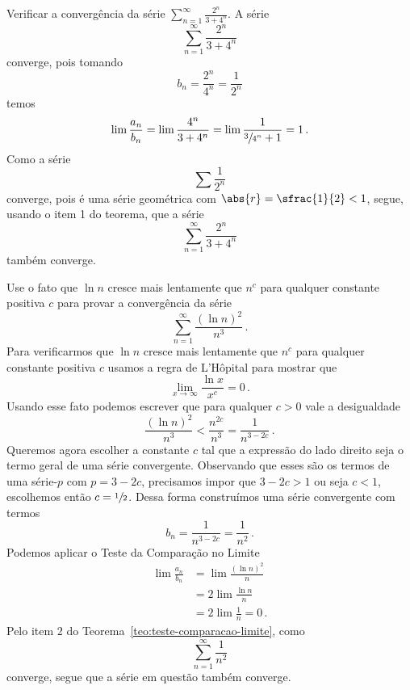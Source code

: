 \begin{example}
  Verificar a convergência da série
  \(
    \sum_{n=1}^\infty \frac{2^n}{3+4^n}
  \).
  \solution
  A série
  \[
    \sum_{n=1}^\infty \frac{2^n}{3+4^n}
  \]
  converge, pois tomando
  \[
    b_n=\frac{2^n}{4^n}=\frac{1}{2^n}
  \]
  temos
  \[
    \lim \frac{a_n}{b_n} = \lim \frac{4^n}{3+4^n}
                         = \lim \frac{1}{\sfrac{3}{4^n}+1}
                         = 1                  \,.
  \]
  Como a série
  \[
    \sum \frac{1}{2^n}
  \]
  converge, pois é uma série geométrica com $\abs{r}=\sfrac{1}{2}<1$,
  segue, usando o item 1 do teorema, que a série
  \[
    \sum_{n=1}^\infty \frac{2^n}{3+4^n}
  \]
  também converge.
\end{example}

\begin{example}
  Use o fato que $\ln n$ cresce mais lentamente que $n^c$ para qualquer
  constante positiva $c$ para provar a convergência da série
  \[
    \sum_{n=1}^\infty \frac{(\ln n)^2}{n^3}      \,.
  \]
  \solution
  Para verificarmos que $\ln n$ cresce mais lentamente que $n^c$ para qualquer
  constante positiva $c$ usamos a regra de L'Hôpital para mostrar que
  \[
    \lim_{x\to \infty}\frac{\ln x}{x^c} = 0   \,.
  \]
  Usando esse fato podemos escrever que para qualquer $c>0$ vale a desigualdade
  \[
    \frac{\left(\ln n\right)^2}{n^3} < \frac{n^{2c}}{n^3} = \frac{1}{n^{3-2c}}     \,.
  \]
  Queremos agora escolher a constante $c$ tal que a expressão do lado direito
  seja o termo geral de uma série convergente.
  Observando que esses são os termos de uma série-$p$ com $p=3-2c$, precisamos
  impor que $3-2c>1$ ou seja $c<1$, escolhemos então \(c=\sfrac{1}{2}\).
  Dessa forma construímos uma série convergente com termos
  \[
     b_n = \frac{1}{n^{3-2c}}
         = \frac{1}{n^2}     \,.
  \]
  Podemos aplicar o Teste da Comparação no Limite
  \begin{align*}
    \lim \frac{a_n}{b_n} & = \lim \frac{(\ln n)^2} {n} \\[3mm]
                         & =2\lim \frac{\ln n}{n}      \\[3mm]
                         & =2\lim \frac{ 1}{n}=0       \,.
  \end{align*}
  Pelo item $2$ do Teorema~\ref{teo:teste-comparacao-limite},
  como
  \[
    \sum_{n=1}^\infty \frac{1}{n^2}
  \]
  converge, segue que a série em questão também converge.
\end{example}

